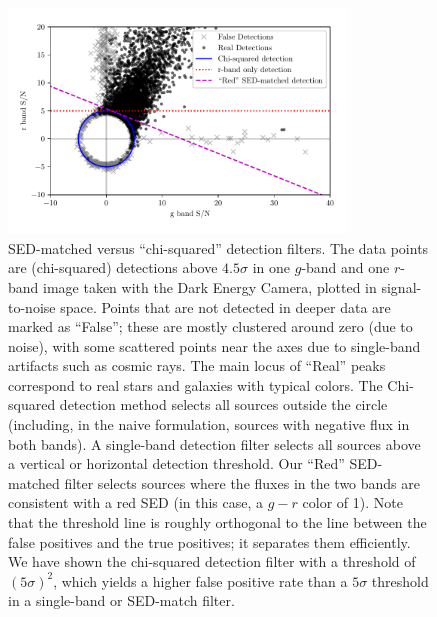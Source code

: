 \documentclass[11pt,letterpaper,linenumbers]{aastex63}
\begin{document}
\begin{figure}
  \begin{center}
    \includegraphics[width=0.8\textwidth]{sed-matched}
    \caption{SED-matched versus ``chi-squared'' detection filters.
      The data points are (chi-squared) detections above $4.5 \sigma$
      in one $g$-band and one $r$-band image taken with the Dark
      Energy Camera, plotted in signal-to-noise space.  Points that
      are not detected in deeper data are marked
      as ``False''; these are mostly clustered around zero (due to
      noise), with some scattered points near the axes due to
      single-band artifacts such as cosmic rays. The main locus of
      ``Real'' peaks correspond to real stars and galaxies with
      typical colors.  The Chi-squared detection method selects all
      sources outside the circle (including, in the naive formulation,
      sources with negative flux in both bands).  A single-band
      detection filter selects all sources above a vertical or
      horizontal detection threshold.  Our ``Red'' SED-matched filter
      selects sources where the fluxes in the two bands are consistent
      with a red SED (in this case, a $g - r$ color of 1).  Note that
      the threshold line is roughly orthogonal to the line between the
      false positives and the true positives; it separates them
      efficiently.  We have shown the chi-squared detection filter
      with a threshold of $(5\sigma)^2$, which yields a higher false
      positive rate than a $5\sigma$ threshold in a single-band or
      SED-match filter.
      \label{fig:sedmatched}
    }
  \end{center}
\end{figure}
\end{document}
